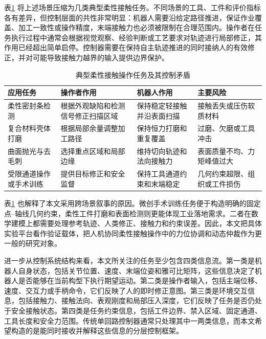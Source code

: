 表\ref{tab:ch1_application_scenarios} 将上述场景压缩为几类典型柔性接触任务。不同场景的工具、工件和评价指标各有差异，但控制层面的共性非常明显：机器人需要沿给定路径推进，保证作业覆盖、加工一致性或操作精度，末端接触力也必须被限制在合理范围内。操作者在任务执行过程中通常会根据视觉观察、经验判断或工艺要求对轨迹进行局部修正，其作用已经超出简单启停。控制器需要在保持自主轨迹推进的同时接纳人的有效修正，并对可能导致接触力越界的输入提供边界保护。

\begin{table}[H]
  \centering
  \caption{典型柔性接触操作任务及其控制矛盾}
  \label{tab:ch1_application_scenarios}
  \begin{tabular}{p{}p{}p{}p{}}
    \toprule
    应用任务 & 操作者作用 & 机器人作用 & 主要风险 \\
    \midrule
    柔性密封条检测 & 根据外观缺陷和检测信号修正扫描区域 & 保持稳定轻接触并沿表面扫描 & 接触丢失或压伤软质材料 \\
    复合材料壳体打磨 & 根据局部余量调整加工路径 & 保持恒力打磨和重复覆盖 & 过磨、欠磨或工具冲击 \\
    曲面抛光与去毛刺 & 选择重点区域和局部边缘 & 维持切向轨迹和法向接触力 & 表面质量不均、力矩峰值过大 \\
    受限通道操作或手术训练 & 提供目标修正和安全监督 & 保持工具通道约束和末端稳定 & 几何约束超限、组织或工件损伤 \\
    \bottomrule
  \end{tabular}
\end{table}

表\ref{tab:ch1_application_scenarios} 也解释了本文采用跨场景叙事的原因。微创手术训练任务便于构造明确的固定点--轴线几何约束，柔性工件打磨和表面检测则更能体现工业落地需求。二者在数学建模上都需要处理参考轨迹、人类修正、接触力和约束误差。因此，本文把具体实验平台看作验证载体，把人机协同柔性接触操作中的力位协调和动态仲裁作为更一般的研究对象。

进一步从控制系统结构来看，本文所关注的任务至少包含四类信息流。第一类是机器人自身状态，包括关节位置、速度、末端位姿和雅可比矩阵，这些信息决定了机器人是否能够在当前构型下执行期望运动。第二类是操作者输入，包括主端位移、速度、交互力或手柄命令，它们反映了人的即时修正意图。第三类是环境交互信息，包括接触力、接触法向、表观刚度和局部压入深度，它们反映了任务是否仍处于安全接触状态。第四类是任务约束信息，包括工件边界、禁入区域、固定通道、工具长度和安全力范围。传统单回路控制器通常只处理其中一两类信息，而本文希望构造的是能同时接收并解释这些信息的分层控制框架。

